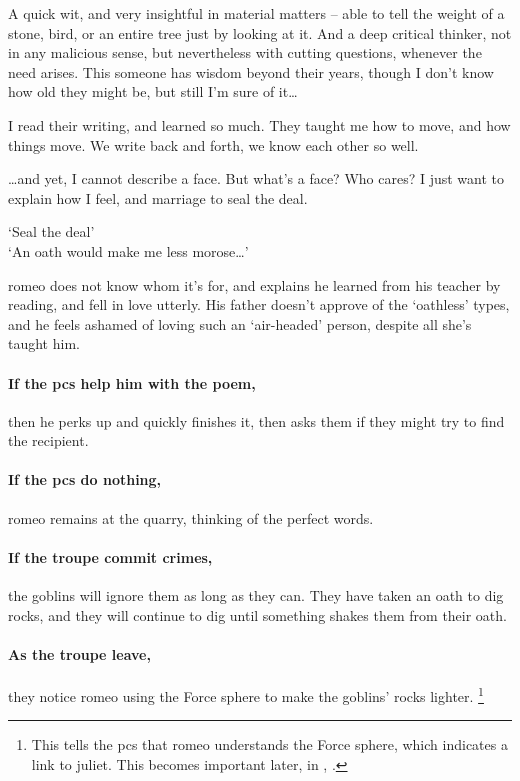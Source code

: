 \begin{multicols}{2}
\begin{speechtext}
  A quick wit, and very insightful in material matters -- able to tell the weight of a stone, bird, or an entire tree just by looking at it.
  And a deep critical thinker, not in any malicious sense, but nevertheless with cutting questions, whenever the need arises.
  This someone has wisdom beyond their years, though I don't know how old they might be, but still I'm sure of it\ldots

  I read their writing, and learned so much.
  They taught me how to move, and how things move.
  We write back and forth, we know each other so well.

  \ldots and yet, I cannot describe a face.
  But what's a face?
  Who cares?
  I just want to explain how I feel, and marriage to seal the deal.

  `Seal the deal'\\
  `An oath would make me less morose\ldots'

\end{speechtext}

\gls{romeo} does not know whom it's for, and explains he learned from his teacher by reading, and fell in love utterly.
His father doesn't approve of the `oathless' types, and he feels ashamed of loving such an `air-headed' person, despite all she's taught him.

\paragraph{If the \glspl{pc} help him with the poem,}
then he perks up and quickly finishes it, then asks them if they might try to find the recipient.

\paragraph{If the \glspl{pc} do nothing,}
\gls{romeo} remains at the quarry, thinking of the perfect words.

\paragraph{If the troupe commit crimes,}
the goblins will ignore them as long as they can.
They have taken an oath to dig rocks, and they will continue to dig until something shakes them from their oath.

\romeo

\showStdSpells

\paragraph{As the troupe leave,}
they notice \gls{romeo} using the Force \gls{sphere} to make the goblins' rocks lighter.%
\footnote{This tells the \glspl{pc} that \gls{romeo} understands the Force \gls{sphere}, which indicates a link to \gls{juliet}.
This becomes important later, in , .}


\end{multicols}
